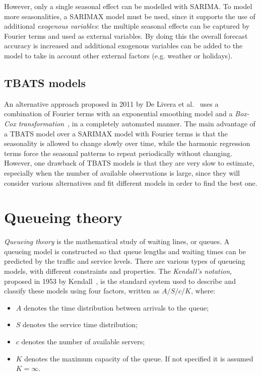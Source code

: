 However, only a single seasonal effect can be modelled with SARIMA. To model more seasonalities, a SARIMAX model must be used, since it supports the use of additional \emph{exogenous variables}: the multiple seasonal effects can be captured by Fourier terms and used as external variables. By doing this the overall forecast accuracy is increased and additional exogenous variables can be added to the model to take in account other external factors (e.g. weather or holidays).

\subsection{TBATS models}
\label{subsec:tbats_models}

An alternative approach proposed in 2011 by De Livera et al.~\cite{de_livera} uses a combination of Fourier terms with an exponential smoothing model and a \emph{Box-Cox transformation}~\cite{box}, in a completely automated manner. The main advantage of a TBATS model over a SARIMAX model with Fourier terms is that the seasonality is allowed to change slowly over time, while the harmonic regression terms force the seasonal patterns to repeat periodically without changing. However, one drawback of TBATS models is that they are very slow to estimate, especially when the number of available observations is large, since they will consider various alternatives and fit different models in order to find the best one.

\section{Queueing theory}
\label{sec:queueing_theory}

\emph{Queueing theory} is the mathematical study of waiting lines, or queues. A queueing model is constructed so that queue lengths and waiting times can be predicted by the traffic and service levels. There are various types of queueing models, with different constraints and properties. The \emph{Kendall's notation}, proposed in 1953 by Kendall~\cite{kendall}, is the standard system used to describe and classify these models using four factors, written as \( A/S/c/K \), where:
\begin{itemize}
  \item \( A \) denotes the time distribution between arrivals to the queue;
  \item \( S \) denotes the service time distribution;
  \item \( c \) denotes the number of available servers;
  \item \( K \) denotes the maximum capacity of the queue. If not specified it is assumed \( K = \infty \).
\end{itemize}

